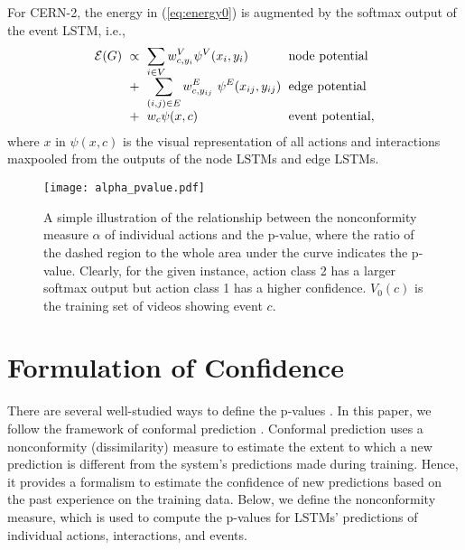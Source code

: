 \documentclass[10pt,twocolumn,letterpaper]{article}
\begin{document}
For CERN-2, the energy in (\ref{eq:energy0}) is augmented by the softmax output of the event LSTM, i.e., 
\begin{equation}
\setlength{\arraycolsep}{3pt}
\begin{array}{llll}
 \mathcal{E}(G) &\propto& \displaystyle \sum_{i 
\in V}  w^V_{c,y_i}\psi^V(x_i,y_i)  & \text{node potential}\\
 &+& \displaystyle \sum_{(i,j) \in E} w^E_{c,y_{ij}} \ \psi^E(x_{ij},y_{ij})  & \text{edge potential}\\
&+& \displaystyle w_c\psi(x, c) & \text{event potential},
\end{array}
\label{eq:energy0_2}
\end{equation}
where $x$ in $\psi(x, c)$ is the visual representation of all actions and interactions maxpooled from the outputs of the node LSTMs and edge LSTMs.

      \begin{figure}[t!]
      \centering
      \texttt{[image: alpha\_pvalue.pdf]}
      \vspace{-5pt}
      \caption{A simple illustration of the relationship between the nonconformity measure $\alpha$ of individual actions and the p-value, where the ratio of the dashed region to the whole area under the curve indicates the p-value. Clearly, for the given instance, action class 2 has a larger softmax output but action class 1 has a higher confidence. $V_0(c)$ is the training set of videos showing event $c$.}
      \vspace{-10pt}
      \label{fig:alpha_pvalue}
   \end{figure}


 \section{Formulation of Confidence } \label{sec:confidence}  
  
There are several well-studied ways to define the p-values \cite{Fisher1950}. In this paper, we follow the framework of conformal prediction \cite{Shafer2008}. Conformal prediction uses a nonconformity (dissimilarity) measure to estimate the extent to which a new prediction is different from the system's predictions made during training. Hence, it provides a formalism to estimate the confidence of new predictions based on the past experience on the training data. Below, we define the nonconformity measure, which is used to compute the p-values for LSTMs' predictions of individual actions, interactions, and events.
\end{document}

